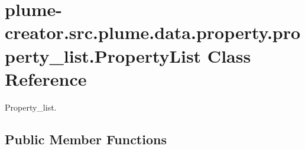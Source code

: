 \hypertarget{classplume-creator_1_1src_1_1plume_1_1data_1_1property_1_1property__list_1_1_property_list}{}\section{plume-\/creator.src.\+plume.\+data.\+property.\+property\+\_\+list.\+Property\+List Class Reference}
\label{classplume-creator_1_1src_1_1plume_1_1data_1_1property_1_1property__list_1_1_property_list}


Property\+\_\+list.  


\subsection*{Public Member Functions}
